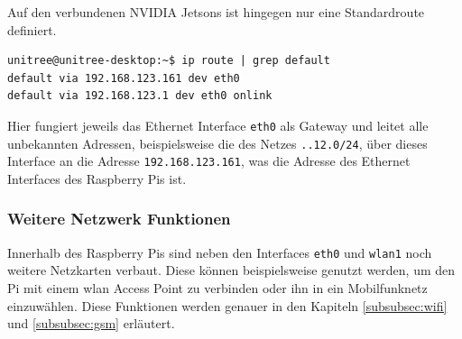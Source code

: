 Auf den verbundenen NVIDIA Jetsons ist hingegen nur eine Standardroute definiert.

\begin{lstlisting}
unitree@unitree-desktop:~$ ip route | grep default
default via 192.168.123.161 dev eth0
default via 192.168.123.1 dev eth0 onlink
\end{lstlisting}

\noindent Hier fungiert jeweils das Ethernet Interface \texttt{eth0} als Gateway und leitet alle unbekannten Adressen,
beispielsweise die des Netzes \texttt{..12.0/24}, über dieses Interface an die Adresse \texttt{192.168.123.161}, was
die Adresse des Ethernet Interfaces des Raspberry Pis ist.

\subsubsection{Weitere Netzwerk Funktionen}

Innerhalb des Raspberry Pis sind neben den Interfaces \texttt{eth0} und \texttt{wlan1} noch weitere Netzkarten verbaut.
Diese können beispielsweise genutzt werden, um den Pi mit einem \gls{wlan} Access Point zu verbinden oder ihn in ein
Mobilfunknetz einzuwählen.
Diese Funktionen werden genauer in den Kapiteln \ref{subsubsec:wifi} und \ref{subsubsec:gsm} erläutert.



